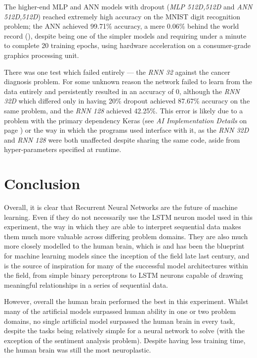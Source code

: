 \documentclass[]{report}
\begin{document}
The higher-end MLP and ANN models with dropout (\emph{MLP 512D,512D} and \emph{ANN 512D,512D}) reached extremely high accuracy on the MNIST digit recognition problem; the ANN achieved 99.71\% accuracy, a mere 0.06\% behind the world record (\cite{ciregan2012multi}), despite being one of the simpler models and requiring under a minute to complete 20 training epochs, using hardware acceleration on a consumer-grade graphics processing unit.

There was one test which failed entirely --- the \emph{RNN 32} against the cancer diagnosis problem. For some unknown reason the network failed to learn from the data entirely and persistently resulted in an accuracy of 0, although the \emph{RNN 32D} which differed only in having 20\% dropout achieved 87.67\% accuracy on the same problem, and the \emph{RNN 128} achieved 42.25\%. This error is likely due to a problem with the primary dependency Keras (see \emph{AI Implementation Details} on page \pageref{sec:Appendix_I}) or the way in which the programs used interface with it, as the \emph{RNN 32D} and \emph{RNN 128} were both unaffected despite sharing the same code, aside from hyper-parameters specified at runtime.

\section{Conclusion}

Overall, it is clear that Recurrent Neural Networks are the future of machine learning. Even if they do not necessarily use the LSTM neuron model used in this experiment, the way in which they are able to interpret sequential data makes them much more valuable across differing problem domains. They are also much more closely modelled to the human brain, which is and has been the blueprint for machine learning models since the inception of the field late last century, and is the source of inspiration for many of the successful model architectures within the field, from simple binary perceptrons to LSTM neurons capable of drawing meaningful relationships in a series of sequential data.

However, overall the human brain performed the best in this experiment. Whilst many of the artificial models surpassed human ability in one or two problem domains, no single artificial model surpassed the human brain in every task, despite the tasks being relatively simple for a neural network to solve (with the exception of the sentiment analysis problem). Despite having less training time, the human brain was still the most neuroplastic.
\end{document}
